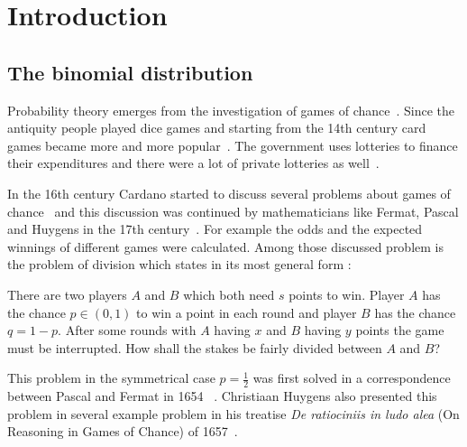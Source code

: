 \chapter{Introduction}

\section{The binomial distribution}

Probability theory emerges from the investigation of games of chance~\cite[p. 4]{hald1}. Since the antiquity people played dice games and starting from the 14th century card games became more and more popular~\cite[pp. 33-34]{hald1}. The government uses lotteries to finance their expenditures and there were a lot of private lotteries as well~\cite[p. 34]{hald1}.

In the 16th century Cardano started to discuss several problems about games of chance~\cite[pp. 33-41]{hald1} and this discussion was continued by mathematicians like Fermat, Pascal and Huygens in the 17th century~\cite[pp. 42-80]{hald1}. For example the odds and the expected winnings of different games were calculated. Among those discussed problem is the problem of division which states in its most general form :

There are two players $A$ and $B$ which both need $s$ points to win. Player $A$ has the chance $p\in(0,1)$ to win a point in each round and player $B$ has the chance $q=1-p$. After some rounds with $A$ having $x$ and $B$ having $y$ points the game must be interrupted. How shall the stakes be fairly divided between $A$ and $B$? 

This problem in the symmetrical case $p=\tfrac 12$ was first solved in a correspondence between Pascal and Fermat in 1654~\cite[pp. 54-63]{hald1} . Christiaan Huygens also presented this problem in several example problem in his treatise \emph{De ratiociniis in ludo alea} (On Reasoning in Games of Chance) of 1657~\cite[pp. 54-63]{hald1}. 


